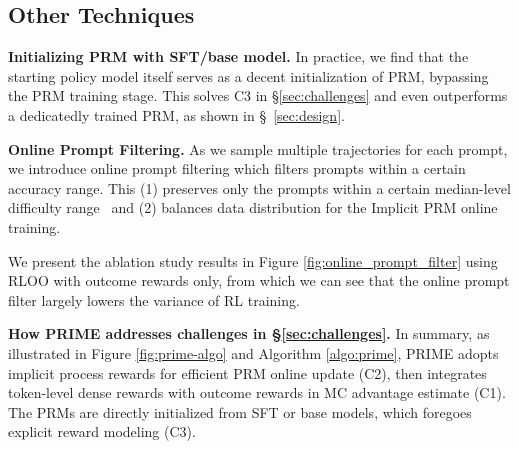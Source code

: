 \subsection{Other Techniques}
\label{sec:prime_init_filter}
\textbf{Initializing PRM with SFT/base model.}
In practice, we find that the starting policy model itself serves as a decent initialization of PRM, bypassing the PRM training stage. This solves C3 in \S \ref{sec:challenges} and even outperforms a dedicatedly trained PRM, as shown in \S~\ref{sec:design}.



\textbf{Online Prompt Filtering.}
As we sample multiple trajectories for each prompt, we introduce online prompt filtering which filters prompts within a certain accuracy range.
This (1) preserves only the prompts within a certain median-level difficulty range~\citep{yang2024qwen25mathtechnicalreportmathematical} and (2) balances data distribution for the Implicit PRM online training.

We present the ablation study results in Figure \ref{fig:online_prompt_filter} using RLOO with outcome rewards only, from which we can see that the online prompt filter largely lowers the variance of RL training. 

\textbf{How PRIME addresses challenges in \S \ref{sec:challenges}.} In summary, as illustrated in Figure \ref{fig:prime-algo} and Algorithm \ref{algo:prime}, PRIME adopts implicit process rewards for efficient PRM online update (C2), then integrates token-level dense rewards with outcome rewards in MC advantage estimate (C1). The PRMs are directly initialized from SFT or base models, which foregoes explicit reward modeling (C3). 














